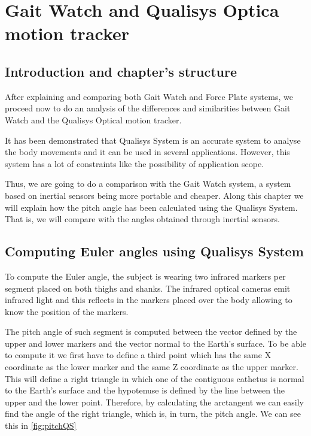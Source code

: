 \chapter{Gait Watch and Qualisys Optica motion tracker}
\label{ch:GWandQS}

\section{Introduction and chapter's structure}
After explaining and comparing both Gait Watch and Force Plate systems, we proceed now to do an analysis of the differences and similarities between Gait Watch and the Qualisys Optical motion tracker.

It has been demonstrated that Qualisys System is an accurate system to analyse the body movements and it can be used in several applications. However, this system has a lot of constraints like the possibility of application scope.

Thus, we are going to do a comparison with the Gait Watch system, a system based on inertial sensors being more portable and cheaper.
Along this chapter we will explain how the pitch angle has been calculated using the Qualisys System. That is, we will compare with the angles obtained through inertial sensors.


\section{Computing Euler angles using Qualisys System}
To compute the Euler angle, the subject is wearing two infrared markers per segment placed on both thighs and shanks. The infrared optical cameras emit infrared light and this reflects in the markers placed over the body allowing to know the position of the markers.

The pitch angle of such segment is computed between the vector defined by the upper and lower markers and the vector normal to the Earth’s surface. To be able to compute it we first have to define a third point which has the same X coordinate as the lower marker and the same Z coordinate as the upper marker. This will define a right triangle in which one of the contiguous cathetus is normal to the Earth’s surface and the hypotenuse is defined by the line between the upper and the lower point. Therefore, by calculating the arctangent we can easily find the angle of the right triangle, which is, in turn, the pitch angle\cite{OlivaresBotzel2013}. We can see this in \ref{fig:pitchQS}

